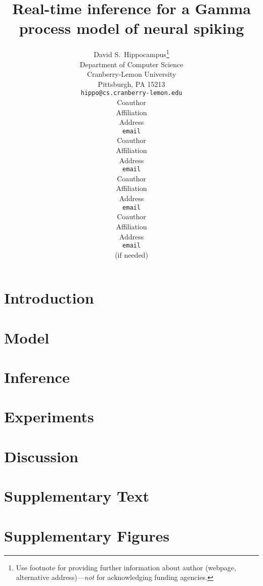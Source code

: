 \documentclass{article} %
\title{Real-time inference for a Gamma process model of neural spiking}
\author{
David S.~Hippocampus\thanks{ Use footnote for providing further information
about author (webpage, alternative address)---\emph{not} for acknowledging
funding agencies.} \\
Department of Computer Science\\
Cranberry-Lemon University\\
Pittsburgh, PA 15213 \\
\texttt{hippo@cs.cranberry-lemon.edu} \\
\And
Coauthor \\
Affiliation \\
Address \\
\texttt{email} \\
\AND
Coauthor \\
Affiliation \\
Address \\
\texttt{email} \\
\And
Coauthor \\
Affiliation \\
Address \\
\texttt{email} \\
\And
Coauthor \\
Affiliation \\
Address \\
\texttt{email} \\
(if needed)\\
}
\begin{document}
 


\maketitle

\begin{abstract}

\end{abstract}

\section{Introduction}



 
\section{Model}


\section{Inference} \label{sec:inf}



\section{Experiments}


 
\section{Discussion}




\begin{comment}
\subsubsection*{Acknowledgments}

Use unnumbered third level headings for the acknowledgments. All
acknowledgments go at the end of the paper. Do not include 
acknowledgments in the anonymized submission, only in the 
final paper. 
\end{comment}

\clearpage
{\small


}

\clearpage
\appendix

\section{Supplementary Text}


\section{Supplementary Figures}

\end{document}
